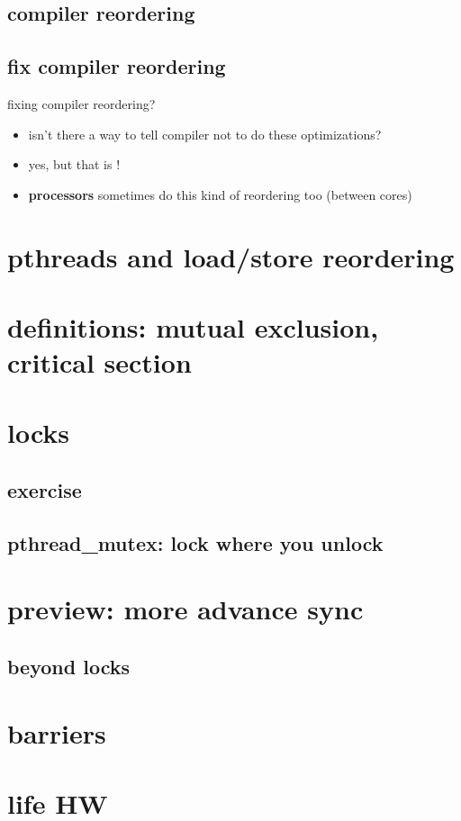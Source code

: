 \subsection{compiler reordering}


\subsection{fix compiler reordering}
\begin{frame}{fixing compiler reordering?}
    \begin{itemize}
    \item isn't there a way to tell compiler not to do these optimizations?
    \item yes, but that is !
    \item \textbf{processors} sometimes do this kind of reordering too (between cores)
    \end{itemize}
\end{frame}

\section{pthreads and load/store reordering}


\section{definitions: mutual exclusion, critical section}


\section{locks}




\subsection{exercise}


\subsection{pthread\_mutex: lock where you unlock}


\section{preview: more advance sync}


\subsection{beyond locks}


\section{barriers}


\section{life HW}



